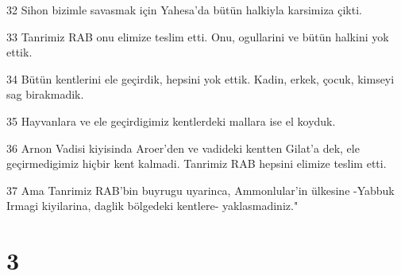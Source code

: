 \par 32 Sihon bizimle savasmak için Yahesa'da bütün halkiyla karsimiza çikti.
\par 33 Tanrimiz RAB onu elimize teslim etti. Onu, ogullarini ve bütün halkini yok ettik.
\par 34 Bütün kentlerini ele geçirdik, hepsini yok ettik. Kadin, erkek, çocuk, kimseyi sag birakmadik.
\par 35 Hayvanlara ve ele geçirdigimiz kentlerdeki mallara ise el koyduk.
\par 36 Arnon Vadisi kiyisinda Aroer'den ve vadideki kentten Gilat'a dek, ele geçirmedigimiz hiçbir kent kalmadi. Tanrimiz RAB hepsini elimize teslim etti.
\par 37 Ama Tanrimiz RAB'bin buyrugu uyarinca, Ammonlular'in ülkesine -Yabbuk Irmagi kiyilarina, daglik bölgedeki kentlere- yaklasmadiniz."

\chapter{3}

